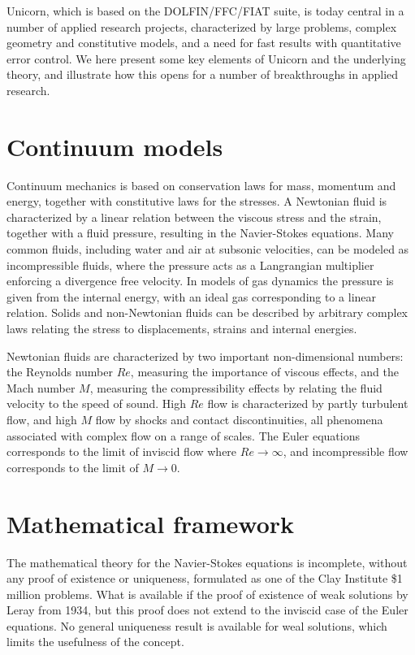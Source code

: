 Unicorn, which is based on the DOLFIN/FFC/FIAT suite, is today central
in a number of applied research projects, characterized by large
problems, complex geometry and constitutive models, and a need for
fast results with quantitative error control.  We here present some
key elements of Unicorn and the underlying theory, and illustrate how
this opens for a number of breakthroughs in applied research.

\section{Continuum models}

Continuum mechanics is based on conservation laws for mass, momentum
and energy, together with constitutive laws for the stresses. A
Newtonian fluid is characterized by a linear relation between the
viscous stress and the strain, together with a fluid pressure,
resulting in the Navier-Stokes equations.  Many common fluids,
including water and air at subsonic velocities, can be modeled as
incompressible fluids, where the pressure acts as a Langrangian
multiplier enforcing a divergence free velocity. In models of gas
dynamics the pressure is given from the internal energy, with an ideal
gas corresponding to a linear relation.  Solids and non-Newtonian
fluids can be described by arbitrary complex laws relating the stress
to displacements, strains and internal energies.

Newtonian fluids are characterized by two important non-dimensional
numbers: the Reynolds number $Re$, measuring the importance of viscous
effects, and the Mach number $M$, measuring the compressibility
effects by relating the fluid velocity to the speed of sound. High
$Re$ flow is characterized by partly turbulent flow, and high $M$ flow
by shocks and contact discontinuities, all phenomena associated with
complex flow on a range of scales. The Euler equations corresponds to
the limit of inviscid flow where $Re \rightarrow \infty$, and
incompressible flow corresponds to the limit of $M\rightarrow 0$.

\section{Mathematical framework}

The mathematical theory for the Navier-Stokes equations is incomplete,
without any proof of existence or uniqueness, formulated as one of the
Clay Institute \$1 million problems. What is available if the proof of
existence of weak solutions by Leray from 1934, but this proof does
not extend to the inviscid case of the Euler equations. No general
uniqueness result is available for weal solutions, which limits the
usefulness of the concept.

